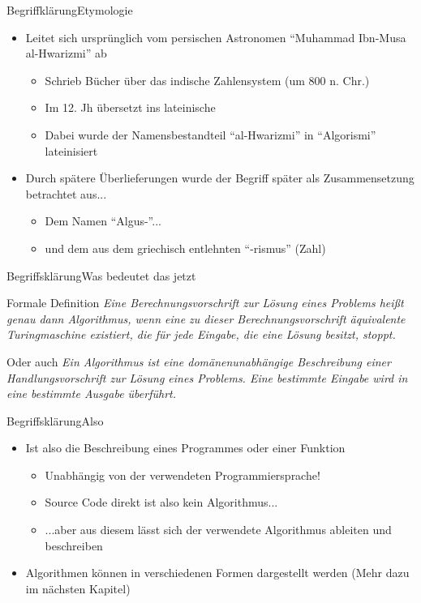 
\begin{frame}{Begriffklärung}{Etymologie}
    \begin{itemize}[<+->]
        \item Leitet sich ursprünglich vom persischen Astronomen "`Muhammad Ibn-Musa al-Hwarizmi"' ab
        \begin{itemize}
            \item Schrieb Bücher über das indische Zahlensystem (um 800 n. Chr.)
            \item Im 12. Jh übersetzt ins lateinische
            \item Dabei wurde der Namensbestandteil "`al-Hwarizmi"' in "`Algorismi"' lateinisiert
        \end{itemize}
        \item Durch spätere Überlieferungen wurde der Begriff später als Zusammensetzung betrachtet aus...
        \begin{itemize}
            \item Dem Namen "`Algus-"'...
            \item und dem aus dem griechisch entlehnten "`-rismus"' (Zahl)
        \end{itemize}
        \end{itemize}
\end{frame}

\begin{frame}{Begriffsklärung}{Was bedeutet das jetzt}
    \begin{block}{Formale Definition}
    \textit{Eine Berechnungsvorschrift zur Lösung eines Problems heißt genau dann Algorithmus, wenn eine zu dieser Berechnungsvorschrift äquivalente Turingmaschine existiert, die für jede Eingabe, die eine Lösung besitzt, stoppt.}
    \end{block}
    \pause
    \begin{alertblock}{Oder auch}
    \textit{Ein Algorithmus ist eine domänenunabhängige Beschreibung einer Handlungsvorschrift zur Lösung eines Problems. Eine bestimmte Eingabe wird in eine bestimmte Ausgabe überführt.}
    \end{alertblock}
\end{frame}

\begin{frame}{Begriffsklärung}{Also}
    \begin{itemize}[<+->]
        \item Ist also die Beschreibung eines Programmes oder einer Funktion
        \begin{itemize}
            \item Unabhängig von der verwendeten Programmiersprache!
            \item Source Code direkt ist also kein Algorithmus...
            \item ...aber aus diesem lässt sich der verwendete Algorithmus ableiten und beschreiben
        \end{itemize}
        \item Algorithmen können in verschiedenen Formen dargestellt werden (Mehr dazu im nächsten Kapitel)
    \end{itemize}
\end{frame}

